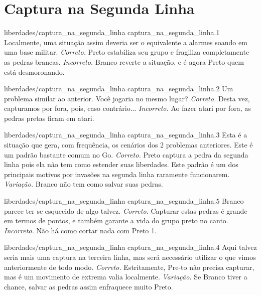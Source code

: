 \chapter{Captura na Segunda Linha}

\emptypage

\problemAnswerDiagram
  {liberdades/captura_na_segunda_linha}
  {captura_na_segunda_linha.1}
  {Localmente, uma situação assim deveria ser o equivalente a alarmes soando em uma base militar.}
  {\emph{Correto.} Preto estabiliza seu grupo e fragiliza completamente as pedras brancas.}
  {\emph{Incorreto.} Branco reverte a situação, e é agora Preto quem está desmoronando.}

\problemAnswerDiagram
  {liberdades/captura_na_segunda_linha}
  {captura_na_segunda_linha.2}
  {Um problema similar ao anterior. Você jogaria no mesmo lugar?}
  {\emph{Correto.} Desta vez, capturamos por fora, pois, caso contrário...}
  {\emph{Incorreto.} Ao fazer atari por fora, as pedras pretas ficam em atari.}

\problemAnswerDiagram
  {liberdades/captura_na_segunda_linha}
  {captura_na_segunda_linha.3}
  {Esta é a situação que gera, com frequência, os cenários dos 2 problemas anteriores. Este é um padrão bastante comum no Go.}
  {\emph{Correto.} Preto captura a pedra da segunda linha pois ela não tem como estender suas liberdades. Este padrão é um dos principais motivos por invasões na segunda linha raramente funcionarem.}
  {\emph{Variação.} Branco não tem como salvar suas pedras.}

\problemAnswerDiagram
  {liberdades/captura_na_segunda_linha}
  {captura_na_segunda_linha.5}
  {Branco parece ter se esquecido de algo talvez.}
  {\emph{Correto.} Capturar estas pedras é grande em termos de pontos, e também garante a vida do grupo preto no canto.}
  {\emph{Incorreto.} Não há como cortar nada com Preto 1.}

\problemAnswerDiagram
  {liberdades/captura_na_segunda_linha}
  {captura_na_segunda_linha.4}
  {Aqui talvez seria mais uma captura na terceira linha, mas será necessário utilizar o que vimos anteriormente de todo modo.}
  {\emph{Correto.} Estritamente, Pre-to não precisa capturar, mas é um movimento de extrema valia localmente.}
  {\emph{Variação.} Se Branco tiver a chance, salvar as pedras assim enfraquece muito Preto.}

\clearedpage
\clearedpage

